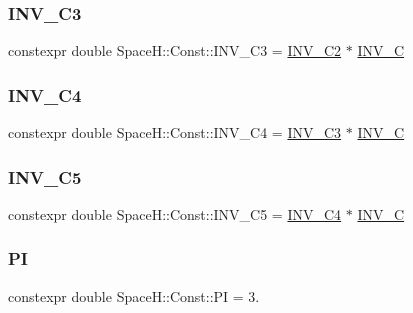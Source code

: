 \mbox{\label{namespace_space_h_1_1_const_a8a27f7c32317db823a656ceeaf6223dd}} 
\subsubsection{\texorpdfstring{I\+N\+V\+\_\+\+C3}{INV\_C3}}
{\footnotesize\ttfamily constexpr double Space\+H\+::\+Const\+::\+I\+N\+V\+\_\+\+C3 = \mbox{\hyperlink{namespace_space_h_1_1_const_ac438c0ca124c73e6a55ef0d4afd05551}{I\+N\+V\+\_\+\+C2}} $\ast$ \mbox{\hyperlink{namespace_space_h_1_1_const_a453eccad0d73caeedd6168a50d04d190}{I\+N\+V\+\_\+C}}}

\mbox{\label{namespace_space_h_1_1_const_a2adde6a8a2a2def2a09e650f6cdcbf98}} 
\subsubsection{\texorpdfstring{I\+N\+V\+\_\+\+C4}{INV\_C4}}
{\footnotesize\ttfamily constexpr double Space\+H\+::\+Const\+::\+I\+N\+V\+\_\+\+C4 = \mbox{\hyperlink{namespace_space_h_1_1_const_a8a27f7c32317db823a656ceeaf6223dd}{I\+N\+V\+\_\+\+C3}} $\ast$ \mbox{\hyperlink{namespace_space_h_1_1_const_a453eccad0d73caeedd6168a50d04d190}{I\+N\+V\+\_\+C}}}

\mbox{\label{namespace_space_h_1_1_const_a6e9515f852a58219dbb6ceb0f8b381a2}} 
\subsubsection{\texorpdfstring{I\+N\+V\+\_\+\+C5}{INV\_C5}}
{\footnotesize\ttfamily constexpr double Space\+H\+::\+Const\+::\+I\+N\+V\+\_\+\+C5 = \mbox{\hyperlink{namespace_space_h_1_1_const_a2adde6a8a2a2def2a09e650f6cdcbf98}{I\+N\+V\+\_\+\+C4}} $\ast$ \mbox{\hyperlink{namespace_space_h_1_1_const_a453eccad0d73caeedd6168a50d04d190}{I\+N\+V\+\_\+C}}}

\mbox{\label{namespace_space_h_1_1_const_afdcc70c6f78ec4cf7baad3525ba7c618}} 
\subsubsection{\texorpdfstring{PI}{PI}}
{\footnotesize\ttfamily constexpr double Space\+H\+::\+Const\+::\+PI = 3.}

